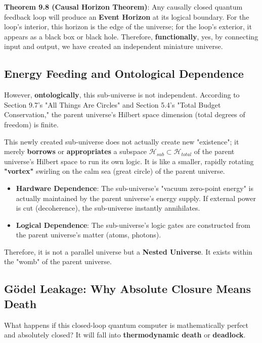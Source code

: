\textbf{Theorem 9.8 (Causal Horizon Theorem)}:
Any causally closed quantum feedback loop will produce an \textbf{Event Horizon} at its logical boundary. For the loop's interior, this horizon is the edge of the universe; for the loop's exterior, it appears as a black box or black hole.
Therefore, \textbf{functionally}, yes, by connecting input and output, we have created an independent miniature universe.

\subsection{Energy Feeding and Ontological Dependence}

However, \textbf{ontologically}, this sub-universe is not independent.
According to Section 9.7's "All Things Are Circles" and Section 5.4's "Total Budget Conservation," the parent universe's Hilbert space dimension (total degrees of freedom) is finite.

This newly created sub-universe does not actually create new "existence"; it merely \textbf{borrows} or \textbf{appropriates} a subspace $\mathcal{H}_{sub} \subset \mathcal{H}_{total}$ of the parent universe's Hilbert space to run its own logic.
It is like a smaller, rapidly rotating \textbf{"vortex"} swirling on the calm sea (great circle) of the parent universe.

\begin{itemize}
\item \textbf{Hardware Dependence}: The sub-universe's "vacuum zero-point energy" is actually maintained by the parent universe's energy supply. If external power is cut (decoherence), the sub-universe instantly annihilates.
\item \textbf{Logical Dependence}: The sub-universe's logic gates are constructed from the parent universe's matter (atoms, photons).
\end{itemize}

Therefore, it is not a parallel universe but a \textbf{Nested Universe}. It exists within the "womb" of the parent universe.

\subsection{Gödel Leakage: Why Absolute Closure Means Death}

What happens if this closed-loop quantum computer is mathematically perfect and absolutely closed?
It will fall into \textbf{thermodynamic death} or \textbf{deadlock}.

